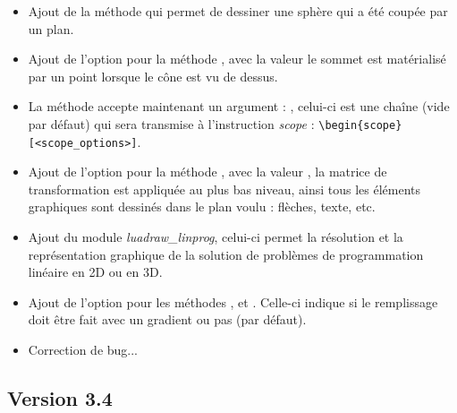 \begin{itemize}
    \item Ajout de la méthode  qui permet de dessiner une sphère qui a été coupée par un plan.

    \item Ajout de l'option  pour la méthode , avec la valeur \true le sommet est matérialisé par un point lorsque le cône est vu de dessus.

    \item La méthode  accepte maintenant un argument : , celui-ci est une chaîne (vide par défaut) qui sera transmise à l'instruction \emph{scope} : \verb|\begin{scope}[<scope_options>]|.

    \item Ajout de l'option  pour la méthode , avec la valeur \true, la matrice de transformation est appliquée au plus bas niveau, ainsi tous les éléments graphiques sont dessinés dans le plan voulu : flèches, texte, etc.
    
    \item Ajout du module \emph{luadraw\_linprog}, celui-ci permet la résolution et la représentation graphique de la solution de problèmes de programmation linéaire en 2D ou en 3D.

    \item Ajout de l'option  pour les méthodes ,  et . Celle-ci indique si le remplissage doit être fait avec un gradient ou pas (\true par défaut).

    \item Correction de bug...
\end{itemize}

\subsection{Version 3.4}

